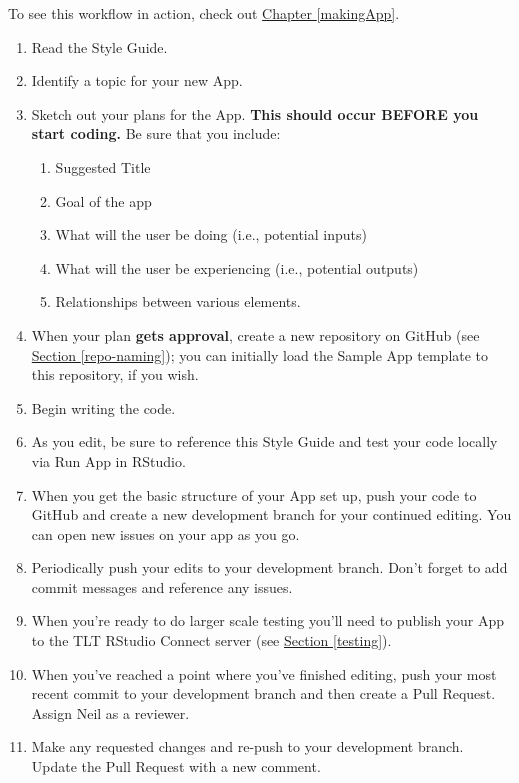 \documentclass[
]{book}
\providecommand{\tightlist}{%
  \setlength{\itemsep}{0pt}\setlength{\parskip}{0pt}}
\begin{document}
To see this workflow in action, check out \protect\hyperlink{makingApp}{Chapter \ref{makingApp}}.

\begin{enumerate}
\def\labelenumi{\arabic{enumi}.}
\tightlist
\item
  Read the Style Guide.
\item
  Identify a topic for your new App.
\item
  Sketch out your plans for the App. \textbf{This should occur BEFORE you start coding.} Be sure that you include:

  \begin{enumerate}
  \def\labelenumii{\alph{enumii}.}
  \tightlist
  \item
    Suggested Title
  \item
    Goal of the app
  \item
    What will the user be doing (i.e., potential inputs)
  \item
    What will the user be experiencing (i.e., potential outputs)
  \item
    Relationships between various elements.
  \end{enumerate}
\item
  When your plan \textbf{gets approval}, create a new repository on GitHub (see \protect\hyperlink{repo-naming}{Section \ref{repo-naming}}); you can initially load the Sample App template to this repository, if you wish.
\item
  Begin writing the code.
\item
  As you edit, be sure to reference this Style Guide and test your code locally via Run App in RStudio.
\item
  When you get the basic structure of your App set up, push your code to GitHub and create a new development branch for your continued editing. You can open new issues on your app as you go.
\item
  Periodically push your edits to your development branch. Don't forget to add commit messages and reference any issues.
\item
  When you're ready to do larger scale testing you'll need to publish your App to the TLT RStudio Connect server (see \protect\hyperlink{testing}{Section \ref{testing}}).
\item
  When you've reached a point where you've finished editing, push your most recent commit to your development branch and then create a Pull Request. Assign Neil as a reviewer.
\item
  Make any requested changes and re-push to your development branch. Update the Pull Request with a new comment.
\end{enumerate}
\end{document}
